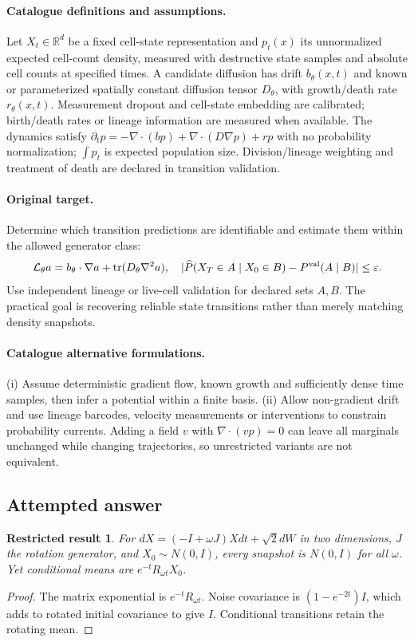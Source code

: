 \documentclass[11pt]{article}
\newcommand{\R}{\mathbb R}
\providecommand{\R}{\mathbb R}
\newtheorem{attemptresult}{Restricted result}[section]
\begin{document}
\paragraph{Catalogue definitions and assumptions.}
Let $X_t\in\R^d$ be a fixed cell-state representation and $p_t(x)$ its unnormalized expected cell-count density, measured with destructive state samples and absolute cell counts at specified times. A candidate diffusion has drift $b_\theta(x,t)$ and known or parameterized spatially constant diffusion tensor $D_\theta$, with growth/death rate $r_\theta(x,t)$. Measurement dropout and cell-state embedding are calibrated; birth/death rates or lineage information are measured when available. The dynamics satisfy $\partial_t p=-\nabla\cdot(bp)+\nabla\cdot(D\nabla p)+rp$ with no probability normalization; $\int p_t$ is expected population size. Division/lineage weighting and treatment of death are declared in transition validation.
\paragraph{Original target.}
Determine which transition predictions are identifiable and estimate them within the allowed generator class:
\[
\mathcal L_\theta a=b_\theta\cdot\nabla a+\operatorname{tr}(D_\theta\nabla^2a),
\quad |\widehat P(X_T\in A\mid X_0\in B)-P^{\rm val}(A\mid B)|\leq\varepsilon.
\]
Use independent lineage or live-cell validation for declared sets $A,B$. The practical goal is recovering reliable state transitions rather than merely matching density snapshots.
\paragraph{Catalogue alternative formulations.}
(i) Assume deterministic gradient flow, known growth and sufficiently dense time samples, then infer a potential within a finite basis. (ii) Allow non-gradient drift and use lineage barcodes, velocity measurements or interventions to constrain probability currents. Adding a field $v$ with $\nabla\cdot(vp)=0$ can leave all marginals unchanged while changing trajectories, so unrestricted variants are not equivalent.
\subsection{Attempted answer}
\begin{attemptresult}
For $dX=(-I+\omega J)Xdt+\sqrt2dW$ in two dimensions, $J$ the rotation generator, and $X_0\sim N(0,I)$, every snapshot is $N(0,I)$ for all $\omega$. Yet conditional means are $e^{-t}R_{\omega t}X_0$.
\end{attemptresult}
\begin{proof}
The matrix exponential is $e^{-t}R_{\omega t}$. Noise covariance is $(1-e^{-2t})I$, which adds to rotated initial covariance to give $I$. Conditional transitions retain the rotating mean.
\end{proof}
\end{document}
